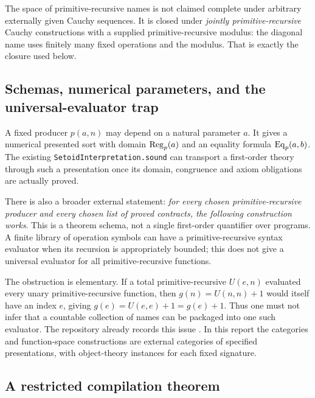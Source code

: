 The space of primitive-recursive names is not claimed complete under
arbitrary externally given Cauchy sequences. It is closed under
\emph{jointly primitive-recursive} Cauchy constructions with a supplied
primitive-recursive modulus: the diagonal name uses finitely many fixed
operations and the modulus. That is exactly the closure used below.

\subsection{Schemas, numerical parameters, and the universal-evaluator trap}

A fixed producer \(p(a,n)\) may depend on a natural parameter \(a\). It gives
a numerical presented sort with domain
\(\operatorname{Reg}_p(a)\) and an equality formula \(\operatorname{Eq}_p(a,b)\). The existing
\texttt{SetoidInterpretation.sound} can transport a first-order theory
through such a presentation once its domain, congruence and axiom obligations
are actually proved.

There is also a broader external statement: \emph{for every chosen
primitive-recursive producer and every chosen list of proved contracts, the
following construction works}. This is a theorem schema, not a single
first-order quantifier over programs. A finite library of operation symbols
can have a primitive-recursive syntax evaluator when its recursion is
appropriately bounded; this does not give a universal evaluator for all
primitive-recursive functions.

The obstruction is elementary. If a total primitive-recursive
\(U(e,n)\) evaluated every unary primitive-recursive function, then
\(g(n)=U(n,n)+1\) would itself have an index \(e\), giving
\(g(e)=U(e,e)+1=g(e)+1\). Thus one must not infer that a countable collection
of names can be packaged into one such evaluator. The repository already
records this issue \cite{repoUniversal}. In this report the categories and
function-space constructions are external categories of specified
presentations, with object-theory instances for each fixed signature.

\subsection{A restricted compilation theorem}

